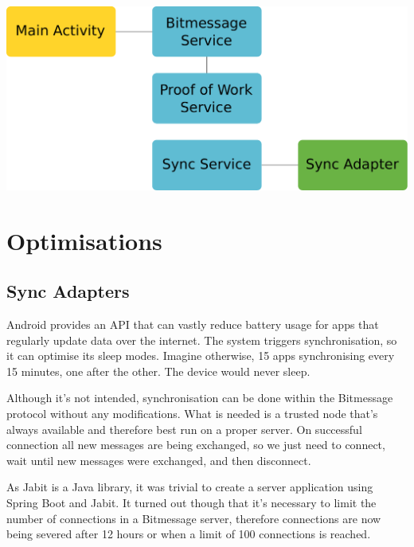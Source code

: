 \documentclass{bfh}
\begin{document}
  \begin{center}
    \includegraphics[width=0.6 \textwidth]{images/services.pdf}
  \end{center}

  \section{Optimisations}
  \subsection{Sync Adapters}
  Android provides an API that can vastly reduce battery usage for apps that regularly update data over the internet. The system triggers synchronisation, so it can optimise its sleep modes. Imagine otherwise, 15 apps synchronising every 15 minutes, one after the other. The device would never sleep.

  Although it's not intended, synchronisation can be done within the Bitmessage protocol without any modifications. What is needed is a trusted node that's always available and therefore best run on a proper server. On successful connection all new messages are being exchanged, so we just need to connect, wait until new messages were exchanged, and then disconnect.

  As Jabit is a Java library, it was trivial to create a server application using Spring Boot and Jabit. It turned out though that it's necessary to limit the number of connections in a Bitmessage server, therefore connections are now being severed after 12 hours or when a limit of 100 connections is reached.

  
  
\end{document}
